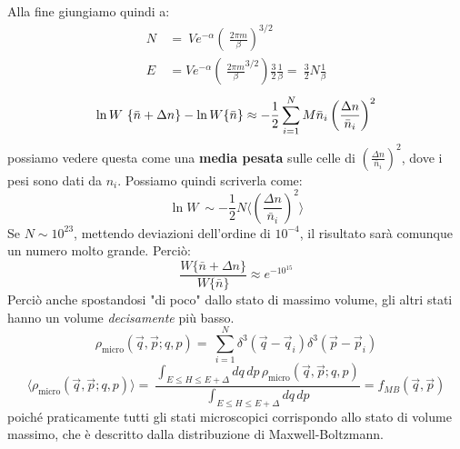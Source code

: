 \documentclass[../MeccanicaStatistica.tex]{subfiles}
\begin{document}
Alla fine giungiamo quindi a:
\begin{align*}
N &=\ Ve^{-\alpha}\left (\ \frac{2\pi m}{\beta} \right)^{3/2}\\
E\ &= V e^{-\alpha}\left (\ \frac{2\pi m}{\beta}^{3/2}\right ) \frac{3}{2} \frac{1}{\beta} =\ \frac{3}{2}N \frac{1}{\beta}
\end{align*}
\[
\ln W\ \{\bar{n}+\Delta n\} - \ln W\{\bar{n}\} \approx -\frac{1}{2} \sum_{i=1}^N{M} \bar{n}_i \left ( \frac{\Delta n}{\bar{n}_i}\right)^2
\]
possiamo vedere questa come una \textbf{media pesata} sulle celle di $\left ( \frac{\Delta n}{\bar{n}_i}\right)^2$, dove i pesi sono dati da $n_i$. Possiamo quindi scriverla come:
\[
\ln W\ \sim -\frac{1}{2}N \langle \left ( \frac{\Delta n}{\bar{n}_i}\right)^2 \rangle 
\]
Se $N\sim 10^{23}$, mettendo deviazioni dell'ordine di $10^{-4}$, il risultato sarà comunque un numero molto grande. Perciò:
\[
\frac{W\{\bar{n}+\Delta n\}}{W \{\bar{n}\}} \approx e^{-10^{15}}
\]
Perciò anche spostandosi "di poco" dallo stato di massimo volume, gli altri stati hanno un volume \textit{decisamente} più basso.\\
\[
\rho_{\text{micro}}(\vec{q}, \vec{p}; q,p) =\ \sum_{i=1}^N \delta^3 (\vec{q}-\vec{q}_i) \delta^3(\vec{p}-\vec{p}_i)
\]
\[
\langle \rho_{\text{micro}}(\vec{q}, \vec{p}; q,p) \rangle =\ \frac{\int_{E\leq H \leq E+\Delta} dq\,dp\, \rho_{\text{micro}}(\vec{q},\vec{p}; q,p)}{\int_{E\leq H \leq E+\Delta} dq\,dp} = f_{MB}(\vec{q},\vec{p})
\]
poiché praticamente tutti gli stati microscopici corrispondo allo stato di volume massimo, che è descritto dalla distribuzione di Maxwell-Boltzmann.\\
\end{document}
